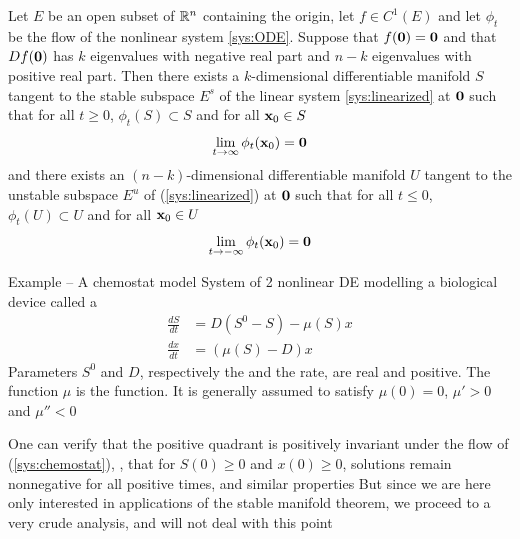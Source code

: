 \documentclass[aspectratio=169]{beamer}
\begin{document}
\begin{frame}
\begin{theorem}\label{th:stable_manifold}
Let $E$ be an open subset of $\mathbb{R}^n$ containing the origin, let $f\in C^1(E)$ and let $\phi_t$ be the flow of the nonlinear system \eqref{sys:ODE}. 
Suppose that $f(\b0)=\b0$ and that $Df(\b0)$ has $k$
eigenvalues with negative real part and $n-k$ eigenvalues with positive real part. 
Then there exists a $k$-dimensional differentiable
manifold $S$ tangent to the stable subspace $E^s$ of the linear system \eqref{sys:linearized} at $\b0$ such that for all $t\geq 0$, $\phi_t(S)\subset S$ and for all $\mathbf{x}_0\in S$
\[
\lim_{t\to\infty} \phi_t(\bx_0)=\b0
\]
and there exists an $(n-k)$-dimensional differentiable manifold $U$ tangent to the unstable subspace $E^u$ of (\ref{sys:linearized}) at $\b0$ such that for all $t\leq 0$, $\phi_t(U)\subset U$ and for all $\mathbf{x}_0\in U$
\[
\lim_{t\to-\infty}\phi_t(\bx_0)=\b0
\]
\end{theorem}
\end{frame}

\begin{frame}{Example -- A chemostat model}
System of 2 nonlinear DE modelling a biological device called a 
\begin{subequations}
\label{sys:chemostat}
\begin{align}
\frac{dS}{dt} &= D\left(S^0-S\right)-\mu(S)x \label{sys:chemostatS} \\
\frac{dx}{dt} &= (\mu(S)-D)x \label{sys:chemostatx}
\end{align}
\end{subequations}
\vfill
Parameters $S^0$ and $D$, respectively the  and the  rate, are real and positive.
The function $\mu$ is the  function. It is generally
assumed to satisfy $\mu(0)=0$, $\mu'>0$ and $\mu''<0$
\end{frame}

\begin{frame}
One can verify that the positive quadrant is
positively invariant under the flow of (\ref{sys:chemostat}),
\ie, that for $S(0)\geq 0$ and $x(0)\geq 0$, solutions remain nonnegative for all positive times, and similar properties
\vfill
But since we are here only interested in applications of the stable
manifold theorem, we proceed to a very crude analysis, and will not
deal with this point
\end{frame}
\end{document}
